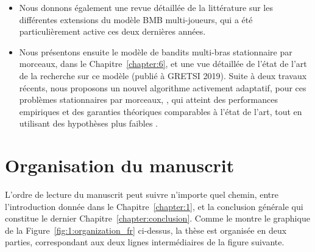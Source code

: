 \begin{resume_fr}
\begin{itemize}
    \item
    Nous donnons également une revue détaillée de la littérature sur les différentes extensions du modèle BMB multi-joueurs, qui a été particulièrement active ces deux dernières années.

    \item
    Nous présentons ensuite le modèle de bandits multi-bras stationnaire par morceaux, dans le Chapitre~\ref{chapter:6}, et une vue détaillée de l'état de l'art de la recherche sur ce modèle \cite{Besson2019GLRT,Besson2019Gretsi} (publié à GRETSI 2019).
    Suite à deux travaux récents, nous proposons un nouvel algorithme activement adaptatif, pour ces problèmes stationnaires par morceaux, \GLRklUCB, qui atteint des performances empiriques et des garanties théoriques comparables à l'état de l'art, tout en utilisant des hypothèses plus faibles .

\end{itemize}

\section*{Organisation du manuscrit}

%
L'ordre de lecture du manuscrit peut suivre n'importe quel chemin, entre l'introduction donnée dans le Chapitre~\ref{chapter:1}, et la conclusion générale qui constitue le dernier Chapitre~\ref{chapter:conclusion}.
Comme le montre le graphique de la Figure~\ref{fig:1:organization_fr} ci-dessus,
la thèse est organisée en deux parties, correspondant aux deux lignes intermédiaires de la figure suivante.


\end{resume_fr}
